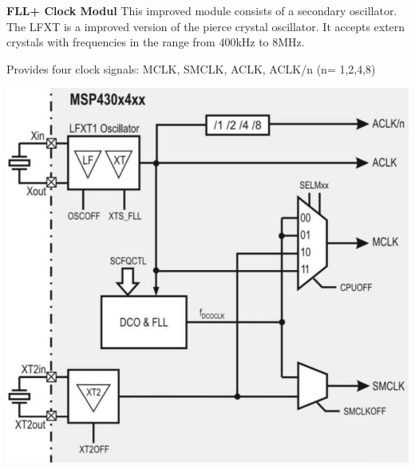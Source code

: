 \vspace{0.5cm}
\begin{minipage}{0.585\linewidth}
    \textbf{FLL+ Clock Modul}\newline\newline
    This improved module consists of a secondary oscillator.\newline
    The LFXT is a improved version of the pierce crystal oscillator. It accepts extern crystals with frequencies in the range from 400kHz to 8MHz.\newline\newline
    
    Provides four clock signals:\newline
    \acs{MCLK}, \acs{SMCLK}, \acs{ACLK}, \acs{ACLK}/n (n= 1,2,4,8)
\end{minipage}
\begin{minipage}{0.41\linewidth}
\includegraphics[width=0.8\linewidth]{images/FLLpClock} 
\end{minipage}

